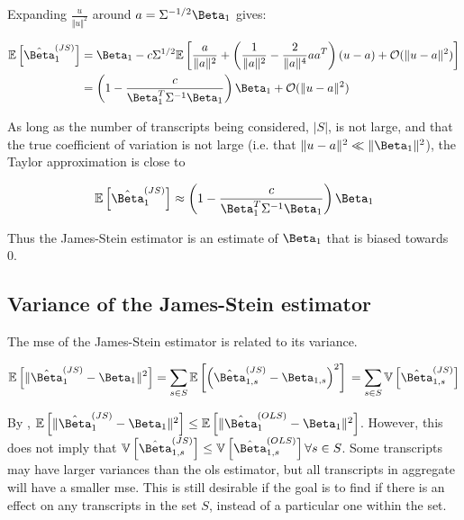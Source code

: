 Expanding $\frac{u}{\Vert u \Vert ^2}$ around $a = \Sigma^{-1/2}\Beta_1$ gives:

\begin{align*}
  \mathbb{E}\left[ \hat{\Beta}_1^{(JS)} \right]
  &= \Beta_1 - c\Sigma^{1/2}\mathbb{E} \left[ \frac{a}{\Vert a \Vert ^2} + \left( \frac{1}{\Vert a \Vert ^2}
    - \frac{2}{\Vert a \Vert ^4} aa^T\right)(u - a) + \mathcal{O}(\Vert u - a \Vert ^2)\right] \\
  & = \left(1 - \frac{c}{\Beta_1^T \Sigma^{-1} \Beta_1} \right) \Beta_1
    + \mathcal{O}(\Vert u - a \Vert ^2)
\end{align*}

As long as the number of transcripts being considered, $|S|$, is not large, and that the true coefficient of variation is not large (i.e. that $\Vert u - a \Vert ^2 \ll \Vert \Beta_1 \Vert ^2$), the Taylor approximation is close to

\begin{equation}
  \mathbb{E}\left[ \hat{\Beta}_1^{(JS)} \right] \approx \left(1 - \frac{c}{\Beta_1^T \Sigma^{-1} \Beta_1} \right) \Beta_1
\end{equation}

Thus the James-Stein estimator is an estimate of $\Beta_1$ that is biased towards 0.

\subsection{Variance of the James-Stein estimator}

The \gls{mse} of the James-Stein estimator is related to its variance.

\begin{equation*}
  \mathbb{E} \left[ \Vert \hat{\Beta}_1^{(JS)} - \Beta_1 \Vert ^2\right] 
  = \sum_{s \in S} \mathbb{E}\left[ \left( \hat{\Beta}_{1,s}^{(JS)} - \Beta_{1,s} \right)^2 \right] \\
  = \sum_{s \in S} \mathbb{V}\left[ \hat{\Beta}_{1,s}^{(JS)} \right]
\end{equation*}

By \cite[REF][]{bockMinimaxEstimatorsMean1975}, $\mathbb{E} \left[ \Vert \hat{\Beta}_1^{(JS)} - \Beta_1 \Vert ^2\right] \le \mathbb{E} \left[ \Vert \hat{\Beta}_1^{(OLS)} - \Beta_1 \Vert ^2\right]$.
However, this does not imply that $\mathbb{V} \left[ \hat{\Beta}_{1,s}^{(JS)} \right] \le \mathbb{V} \left[ \hat{\Beta}_{1,s}^{(OLS)} \right] \forall s \in S$.
Some transcripts may have larger variances than the \gls{ols} estimator, but all transcripts in aggregate will have a smaller \gls{mse}.
This is still desirable if the goal is to find if there is an effect on any transcripts in the set $S$, instead of a particular one within the set.

